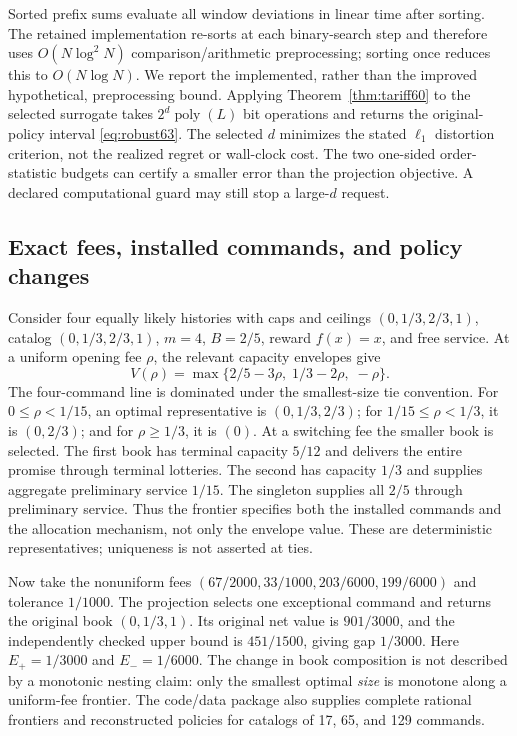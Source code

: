 Sorted prefix sums evaluate all window deviations in linear time after sorting. The retained implementation re-sorts at each binary-search step and therefore uses $O(N\log^2 N)$ comparison/arithmetic preprocessing; sorting once reduces this to $O(N\log N)$. We report the implemented, rather than the improved hypothetical, preprocessing bound. Applying Theorem~\ref{thm:tariff60} to the selected surrogate takes $2^d\operatorname{poly}(L)$ bit operations and returns the original-policy interval \eqref{eq:robust63}. The selected $d$ minimizes the stated $\ell_1$ distortion criterion, not the realized regret or wall-clock cost. The two one-sided order-statistic budgets can certify a smaller error than the projection objective. A declared computational guard may still stop a large-$d$ request.

\subsection{Exact fees, installed commands, and policy changes}\label{sec:frontier63}
Consider four equally likely histories with caps and ceilings $(0,1/3,2/3,1)$, catalog $(0,1/3,2/3,1)$, $m=4$, $B=2/5$, reward $f(x)=x$, and free service. At a uniform opening fee $\rho$, the relevant capacity envelopes give
\[
 V(\rho)=\max\{2/5-3\rho,\;1/3-2\rho,\;-\rho\}.
\]
The four-command line is dominated under the smallest-size tie convention. For $0\leq\rho<1/15$, an optimal representative is $(0,1/3,2/3)$; for $1/15\leq\rho<1/3$, it is $(0,2/3)$; and for $\rho\geq1/3$, it is $(0)$. At a switching fee the smaller book is selected. The first book has terminal capacity $5/12$ and delivers the entire promise through terminal lotteries. The second has capacity $1/3$ and supplies aggregate preliminary service $1/15$. The singleton supplies all $2/5$ through preliminary service. Thus the frontier specifies both the installed commands and the allocation mechanism, not only the envelope value. These are deterministic representatives; uniqueness is not asserted at ties.

Now take the nonuniform fees $(67/2000,33/1000,203/6000,199/6000)$ and tolerance $1/1000$. The projection selects one exceptional command and returns the original book $(0,1/3,1)$. Its original net value is $901/3000$, and the independently checked upper bound is $451/1500$, giving gap $1/3000$. Here $E_+=1/3000$ and $E_-=1/6000$. The change in book composition is not described by a monotonic nesting claim: only the smallest optimal \emph{size} is monotone along a uniform-fee frontier. The code/data package also supplies complete rational frontiers and reconstructed policies for catalogs of 17, 65, and 129 commands.

